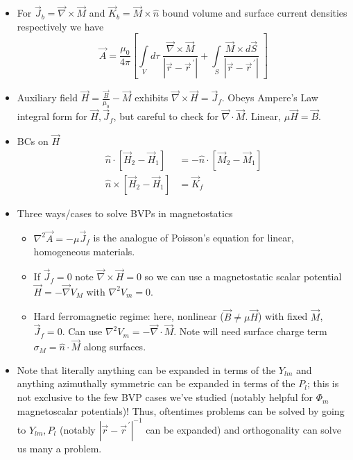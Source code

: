 \documentclass[10pt]{report}
\newcommand{\pvec}[1]{\vec{#1}^{\,\prime}}
\newcommand{\abs}[1]{\left|#1\right|}
\begin{document}
\begin{itemize}
    \item For $\vec{J}_b = \vec{\nabla} \times \vec{M}$ and $\vec{K}_b = \vec{M}\times \hat{n}$ bound volume and surface current densities respectively we have
        $$\vec{A} = \frac{\mu_0}{4\pi}\left[ \int\limits_{V}^{}d\tau\;\frac{\vec{\nabla}\times \vec{M}}{\abs{\vec{r} - \pvec{r}}} + \int\limits_{S}^{}\frac{\vec{M}\times d\vec{S}}{\abs{\vec{r} - \pvec{r}}}\; \right]$$
    \item Auxiliary field $\vec{H} = \frac{\vec{B}}{\mu_0} - \vec{M}$ exhibits $\vec{\nabla}\times \vec{H} = \vec{J}_f$. Obeys Ampere's Law integral form for $\vec{H}, \vec{J}_f$, but careful to check for $\vec{\nabla} \cdot \vec{M}$. Linear, $\mu\vec{H} = \vec{B}$. 
    \item BCs on $\vec{H}$
        \begin{align}
            \hat{n}\cdot \left[ \vec{H}_2 - \vec{H}_1 \right] &= -\hat{n}\cdot \left[ \vec{M}_2 - \vec{M}_1 \right]\\
            \hat{n} \times \left[ \vec{H}_2 - \vec{H}_1 \right] &= \vec{K}_f
        \end{align}
    \item Three ways/cases to solve BVPs in magnetostatics
        \begin{itemize}
            \item $\nabla^2\vec{A} = -\mu \vec{J}_f$ is the analogue of Poisson's equation for linear, homogeneous materials. 
            \item If $\vec{J}_f = 0$ note $\vec{\nabla} \times \vec{H} = 0$ so we can use a magnetostatic scalar potential $\vec{H} = -\vec{\nabla}V_M$ with $\nabla^2 V_m = 0$.
            \item Hard ferromagnetic regime: here, nonlinear ($\vec{B} \neq \mu \vec{H}$) with fixed $\vec{M}$, $\vec{J}_f = 0$. Can use $\nabla^2 V_m = -\vec{\nabla} \cdot\vec{M}$. Note will need surface charge term $\sigma_M = \hat{n} \cdot \vec{M}$ along surfaces.
        \end{itemize}
    \item Note that literally anything can be expanded in terms of the $Y_{lm}$ and anything azimuthally symmetric can be expanded in terms of the $P_l$; this is not exclusive to the few BVP cases we've studied (notably helpful for $\Phi_m$ magnetoscalar potentials)! Thus, oftentimes problems can be solved by going to $Y_{lm}, P_l$ (notably $\abs{\vec{r} - \pvec{r}}^{-1}$ can be expanded) and orthogonality can solve us many a problem.
\end{itemize}
\end{document}
